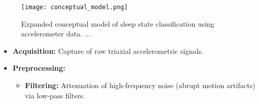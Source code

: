 \documentclass[conference]{IEEEtran}
\begin{document}
\begin{figure}[h]
    \centering
    \texttt{[image: conceptual\_model.png]}
    \caption{Expanded conceptual model of sleep state classification using accelerometer data. ...}
    \label{fig:conceptual_model}
\end{figure}

\begin{itemize}
	\item \textbf{Acquisition:}
	      Capture of raw triaxial accelerometric signals.
	\item \textbf{Preprocessing:}
            \begin{itemize}
		      \item \textbf{Filtering:} Attenuation of high-frequency noise (abrupt motion artifacts) via low-pass filters.
              

\end{itemize}
\end{itemize}
\end{document}
